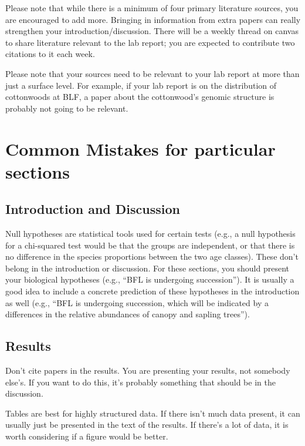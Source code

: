 \documentclass[]{book}
\begin{document}
Please note that while there is a minimum of four primary literature
sources, you are encouraged to add more. Bringing in information from
extra papers can really strengthen your introduction/discussion. There
will be a weekly thread on canvas to share literature relevant to the
lab report; you are expected to contribute two citations to it each
week.

Please note that your sources need to be relevant to your lab report at
more than just a surface level. For example, if your lab report is on
the distribution of cottonwoods at BLF, a paper about the cottonwood's
genomic structure is probably not going to be relevant.

\section{Common Mistakes for particular
sections}\label{common-mistakes-for-particular-sections}

\subsection{Introduction and
Discussion}\label{introduction-and-discussion}

Null hypotheses are statistical tools used for certain tests (e.g., a
null hypothesis for a chi-squared test would be that the groups are
independent, or that there is no difference in the species proportions
between the two age classes). These don't belong in the introduction or
discussion. For these sections, you should present your biological
hypotheses (e.g., ``BFL is undergoing succession''). It is usually a
good idea to include a concrete prediction of these hypotheses in the
introduction as well (e.g., ``BFL is undergoing succession, which will
be indicated by a differences in the relative abundances of canopy and
sapling trees'').

\subsection{Results}\label{results-1}

Don't cite papers in the results. You are presenting your results, not
somebody else's. If you want to do this, it's probably something that
should be in the discussion.

Tables are best for highly structured data. If there isn't much data
present, it can usually just be presented in the text of the results. If
there's a lot of data, it is worth considering if a figure would be
better.
\end{document}
